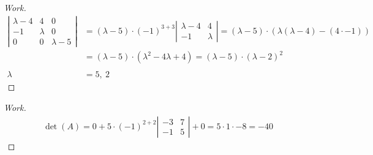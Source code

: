 \documentclass{article}
\begin{document}
\begin{proof}[Work]
  \begin{align*}
    \left\lvert \begin{array}{ccc}
                  \lambda - 4 & 4       & 0         \\
                  -1          & \lambda & 0         \\
                  0           & 0       & \lambda-5
                \end{array} \right\rvert & = (\lambda-5) \cdot (-1)^{3+3} \left\lvert \begin{array}{cc}
                                                                                        \lambda - 4 & 4       \\
                                                                                        -1          & \lambda
                                                                                      \end{array} \right\rvert = (\lambda-5) \cdot (\lambda(\lambda - 4) - (4 \cdot -1)) \\
                                         & = (\lambda-5) \cdot (\lambda^2 - 4\lambda + 4) = (\lambda-5) \cdot (\lambda-2)^2                                              \\ \\
    \lambda                              & = 5,~2
  \end{align*}
\end{proof}
\qdash

\begin{proof}[Work]
  \begin{align*}
    \det(A) = 0 + 5 \cdot (-1)^{2+2} \left\lvert \begin{array}{cc}
                                                   -3 & 7 \\
                                                   -1 & 5
                                                 \end{array} \right\rvert + 0 = 5 \cdot 1 \cdot -8 = -40
  \end{align*}
\end{proof}
\qdash
\end{document}
